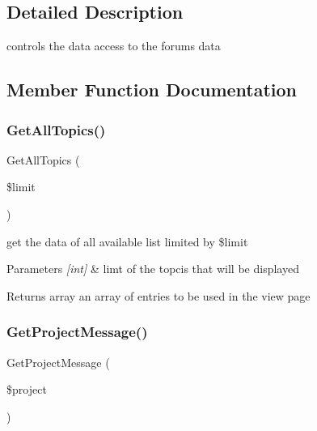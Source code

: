 \subsection{Detailed Description}
controls the data access to the forum\textquotesingle{}s data 

\subsection{Member Function Documentation}
\mbox{\label{class_forum_d_a_o_af42bf7b4e50ddd06c68642bbed774f13}} 
\subsubsection{\texorpdfstring{Get\+All\+Topics()}{GetAllTopics()}}
{\footnotesize\ttfamily Get\+All\+Topics (\begin{DoxyParamCaption}\item[{}]{\$limit }\end{DoxyParamCaption})}



get the data of all available list limited by \$limit 


\begin{DoxyParams}{Parameters}
{\em \mbox{[}int\mbox{]}} & limt of the topcis that will be displayed\\
\hline
\end{DoxyParams}
\begin{DoxyReturn}{Returns}
array an array of entries to be used in the view page 
\end{DoxyReturn}
\mbox{\label{class_forum_d_a_o_ab74cdef7ffe766572595268923a3a3a3}} 
\subsubsection{\texorpdfstring{Get\+Project\+Message()}{GetProjectMessage()}}
{\footnotesize\ttfamily Get\+Project\+Message (\begin{DoxyParamCaption}\item[{}]{\$project }\end{DoxyParamCaption})}



